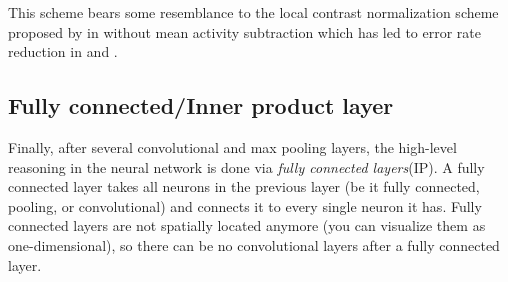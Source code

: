 \indent This scheme bears some resemblance to the local contrast normalization scheme proposed by \citeauthor{jarrett2009best} in \cite{jarrett2009best} without mean activity subtraction  which has led to error rate reduction in \cite{krizhevsky2012imagenet} and \cite{hinton2012improving}. 

\subsection{Fully connected/Inner product layer}

Finally, after several convolutional and max pooling layers, the high-level reasoning in the neural network is done via \textit{fully connected layers}(IP). A fully connected layer takes all neurons in the previous layer (be it fully connected, pooling, or convolutional) and connects it to every single neuron it has. Fully connected layers are not spatially located anymore (you can visualize them as one-dimensional), so there can be no convolutional layers after a fully connected layer. 




